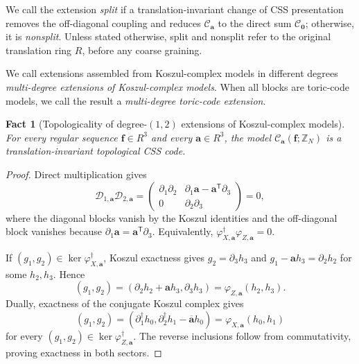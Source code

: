 \documentclass[aps,prx,english,superscriptaddress,twocolumn,tightenlines,showpacs,longbibliography,floatfix,amsfonts]{revtex4-2}
\newtheorem{fact}{Fact}
\theoremstyle{remark}
\theoremstyle{definition}
\begin{document}
We call the extension \emph{split} if a translation-invariant change of CSS
presentation removes the off-diagonal coupling and reduces
\(\mathcal C_{\mathbf a}\) to the direct sum \(\mathcal C_{\mathbf 0}\);
otherwise, it is \emph{nonsplit}.
Unless stated otherwise, split and nonsplit refer to the original translation
ring \(R\), before any coarse graining.

We call extensions assembled from Koszul-complex models in different degrees
\emph{multi-degree extensions of Koszul-complex models}.
When all blocks are toric-code models, we call the result a
\emph{multi-degree toric-code extension}.

\begin{fact}[Topologicality of degree-\((1,2)\) extensions of Koszul-complex models]
	\label{prop:AE-BE-topological}
	For every regular sequence \(\mathbf f\in R^3\) and every
	\(\mathbf a\in R^3\), the model
	\(\mathcal C_{\mathbf a}(\mathbf f;\mathbb Z_N)\) is a
	translation-invariant topological CSS code.
\end{fact}

\begin{proof}
	Direct multiplication gives
	\begin{equation}
		\mathcal D_{1,\mathbf a}\mathcal D_{2,\mathbf a}
		=
		\begin{pmatrix}
			\partial_1\partial_2 &
			\partial_1\mathbf a-\mathbf a^{\mathsf T}\partial_3\\
			0&\partial_2\partial_3
		\end{pmatrix}
		=0,
	\end{equation}
	where the diagonal blocks vanish by the Koszul identities and the
	off-diagonal block vanishes because
	\(\partial_1\mathbf a=\mathbf a^{\mathsf T}\partial_3\).  Equivalently,
	\(\varphi_{X,\mathbf a}^\dagger\varphi_{Z,\mathbf a}=0\).

	If \((g_1,g_2)\in\ker\varphi_{X,\mathbf a}^\dagger\), Koszul exactness
	gives \(g_2=\partial_3h_3\) and
	\(g_1-\mathbf a h_3=\partial_2h_2\) for some \(h_2,h_3\).  Hence
	\begin{equation}
		(g_1,g_2)
		=(\partial_2h_2+\mathbf a h_3,\partial_3h_3)
		=\varphi_{Z,\mathbf a}(h_2,h_3).
	\end{equation}
	Dually, exactness of the conjugate Koszul complex gives
	\begin{equation}
		(g_1,g_2)
		=(\partial_1^\dagger h_0,
		  \partial_2^\dagger h_1-\overline{\mathbf a}h_0)
		=\varphi_{X,\mathbf a}(h_0,h_1)
	\end{equation}
	for every \((g_1,g_2)\in\ker\varphi_{Z,\mathbf a}^\dagger\).
	The reverse inclusions follow from commutativity, proving exactness in both
	sectors.
\end{proof}
\end{document}
